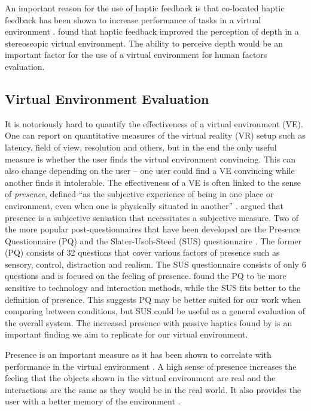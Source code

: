 An important reason for the use of haptic feedback is that co-located haptic feedback has been shown to increase performance of tasks in a virtual environment \citep{swapp_interaction_2006}.
\citet{bouguila_effect_2000} found that haptic feedback improved the perception of depth in a stereoscopic virtual environment.
The ability to perceive depth would be an important factor for the use of a virtual environment for human factors evaluation.

\subsection{Virtual Environment Evaluation}
\label{virtual-environment-evaluation}

It is notoriously hard to quantify the effectiveness of a virtual environment (VE).
One can report on quantitative measures of the virtual reality (VR) setup such as latency, field of view, resolution and others, but in the end the only useful measure is whether the user finds the virtual environment convincing.
This can also change depending on the user -- one user could find a VE convincing while another finds it intolerable.
The effectiveness of a VE is often linked to the sense of \emph{presence}, defined ``as the subjective experience of being in one place or environment, even when one is physically situated in another'' \citep{witmer_measuring_1998}.
\citet{sheridan_musings_1992} argued that presence is a subjective sensation that necessitates a subjective measure.
Two of the more popular post-questionnaires that have been developed are the Presence Questionnaire (PQ) \citep{witmer_measuring_1998} and the Slater-Usoh-Steed (SUS) questionnaire \citep{slater_depth_1994}.
The former (PQ) consists of 32 questions that cover various factors of presence such as sensory, control, distraction and realism.
The SUS questionnaire consists of only 6 questions and is focused on the feeling of presence.
\citet{nystad_comparison_2004} found the PQ to be more sensitive to technology and interaction methods, while the SUS fits better to the definition of presence.
This suggests PQ may be better suited for our work when comparing between conditions, but SUS could be useful as a general evaluation of the overall system.
The increased presence with passive haptics found by \citet{insko_passive_2001} is an important finding we aim to replicate for our virtual environment.

Presence is an important measure as it has been shown to correlate with performance in the virtual environment \citep{youngblut_relationship_2003}.
A high sense of presence increases the feeling that the objects shown in the virtual environment are real and the interactions are the same as they would be in the real world.
It also provides the user with a better memory of the environment \citep{dinh_evaluating_1999}.

